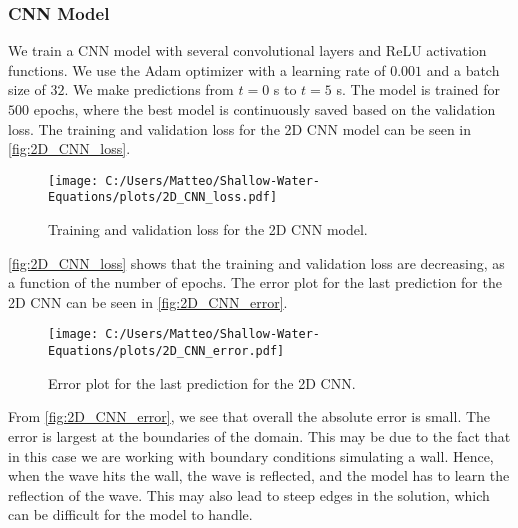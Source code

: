 \subsubsection*{CNN Model}
We train a CNN model with several convolutional layers and ReLU activation functions.
We use the Adam optimizer with a learning rate of $0.001$ and a batch size of $32$.
We make predictions from $t = 0$ s to $t = 5$ s.
The model is trained for $500$ epochs, where the best model is continuously saved based on the validation loss.
The training and validation loss for the 2D CNN model can be seen in \autoref{fig:2D_CNN_loss}.
\begin{figure}[H]
    \centering
    \texttt{[image: C:/Users/Matteo/Shallow-Water-Equations/plots/2D\_CNN\_loss.pdf]}
    \caption{Training and validation loss for the 2D CNN model.}\label{fig:2D_CNN_loss}
\end{figure}
\autoref{fig:2D_CNN_loss} shows that the training and validation loss are decreasing, as a function of the number of epochs.
The error plot for the last prediction for the 2D CNN can be seen in \autoref{fig:2D_CNN_error}.
\begin{figure}[H]
    \centering
    \texttt{[image: C:/Users/Matteo/Shallow-Water-Equations/plots/2D\_CNN\_error.pdf]}
    \caption{Error plot for the last prediction for the 2D CNN.}\label{fig:2D_CNN_error}
\end{figure}
From \autoref{fig:2D_CNN_error}, we see that overall the absolute error is small.
The error is largest at the boundaries of the domain. 
This may be due to the fact that in this case we are working with boundary conditions simulating a wall.
Hence, when the wave hits the wall, the wave is reflected, and the model has to learn the reflection of the wave.
This may also lead to steep edges in the solution, which can be difficult for the model to handle.

